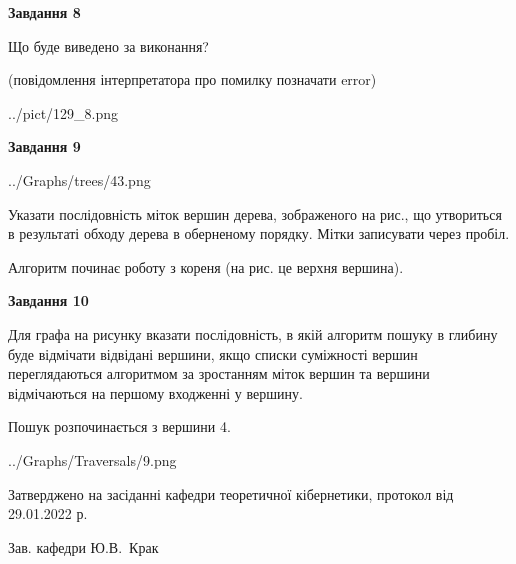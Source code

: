 \documentclass[12pt, ukrainian]{article}
\begin{document}
{\begin {large}
{\begin {center}\textbf{Завдання 8}\end {center}}\par
Що буде виведено за виконання?\par
 (повідомлення інтерпретатора про помилку позначати error)\par
\begin{center}
	{../pict/129_8.png}
\end{center}
\newpage

{\begin {center}\textbf{Завдання 9}\end {center}}\par

\begin{center}
	{../Graphs/trees/43.png}
\end{center}
Указати послідовність міток вершин дерева, зображеного на рис., що утвориться в результаті обходу дерева в оберненому порядку. Мітки записувати через пробіл.\par Алгоритм починає роботу з кореня (на рис. це верхня вершина).\par
\newpage

{\begin {center}\textbf{Завдання 10}\end {center}}\par
Для графа на рисунку вказати послідовність, в якій алгоритм пошуку в глибину буде відмічати відвідані вершини, якщо списки суміжності вершин переглядаються алгоритмом за зростанням міток вершин та вершини відмічаються на першому вход\-женні у вершину.\par
Пошук розпочинається з вершини 4.\par

\begin{center}
	{../Graphs/Traversals/9.png}
\end{center}\par
\newpage


\end {large}
}
{\smallskip \begin {small} Затверджено на засіданні кафедри теоретичної кібернетики, протокол  від   29.01.2022 р.\par\smallskip\smallskip
{\parbox {6.5 cm}{Зав. кафедри \dotfill Ю.В.~Крак}} \end{small}}
\end{document}
